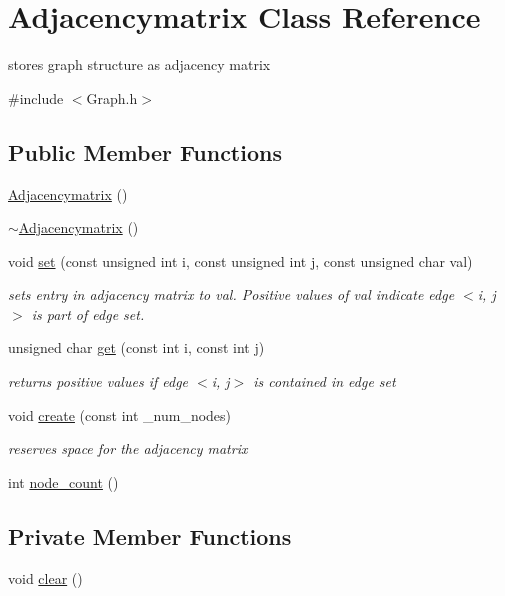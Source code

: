 \hypertarget{class_adjacencymatrix}{}\section{Adjacencymatrix Class Reference}
\label{class_adjacencymatrix}


stores graph structure as adjacency matrix  




{\ttfamily \#include $<$Graph.\+h$>$}

\subsection*{Public Member Functions}
\begin{DoxyCompactItemize}
\item 
\hyperlink{class_adjacencymatrix_a1bced3d3b99bd0674903eda2067d6b2b}{Adjacencymatrix} ()
\item 
\hyperlink{class_adjacencymatrix_a8c8cb0d9b7ef2b69ffef6aa6bffe5997}{$\sim$\+Adjacencymatrix} ()
\item 
void \hyperlink{class_adjacencymatrix_a3bbe9e5ef3dabf7f4db8d7068bc63d56}{set} (const unsigned int i, const unsigned int j, const unsigned char val)
\begin{DoxyCompactList}\small\item\em sets entry in adjacency matrix to val. Positive values of val indicate edge $<$i, j$>$ is part of edge set. \end{DoxyCompactList}\item 
unsigned char \hyperlink{class_adjacencymatrix_ae31070ccb7480ac53580ab0f7a356db2}{get} (const int i, const int j)
\begin{DoxyCompactList}\small\item\em returns positive values if edge $<$i, j$>$ is contained in edge set \end{DoxyCompactList}\item 
void \hyperlink{class_adjacencymatrix_a1c13b78deff3fe765591ea5a32e02a1e}{create} (const int \+\_\+num\+\_\+nodes)
\begin{DoxyCompactList}\small\item\em reserves space for the adjacency matrix \end{DoxyCompactList}\item 
int \hyperlink{class_adjacencymatrix_a93c55ad33e78094b09c4049febb94953}{node\+\_\+count} ()
\end{DoxyCompactItemize}
\subsection*{Private Member Functions}
\begin{DoxyCompactItemize}
\item 
void \hyperlink{class_adjacencymatrix_aacf2bfffc9db379af6e76ba0724ef3b6}{clear} ()
\end{DoxyCompactItemize}

